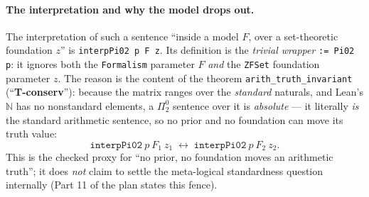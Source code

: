 \documentclass[11pt,a4paper]{report}
\begin{document}
\paragraph{The interpretation and why the model drops out.} The interpretation of
such a sentence ``inside a model \(F\), over a set-theoretic foundation \(z\)'' is
\texttt{interpPi02 p F z}. Its definition is the \emph{trivial wrapper}
\texttt{:= Pi02 p}: it ignores both the \texttt{Formalism} parameter \(F\)
\emph{and} the \texttt{ZFSet} foundation parameter \(z\). The reason is the
content of the theorem \texttt{arith\_truth\_invariant} (``\textbf{T-conserv}''):
because the matrix ranges over the \emph{standard} naturals, and Lean's \(\mathbb{N}\)
has no nonstandard elements, a \(\Pi^0_2\) sentence over it is \emph{absolute} ---
it literally \emph{is} the standard arithmetic sentence, so no prior and no
foundation can move its truth value:
\[
  \texttt{interpPi02}\ p\ F_1\ z_1 \;\longleftrightarrow\; \texttt{interpPi02}\ p\ F_2\ z_2 .
\]
This is the checked proxy for ``no prior, no foundation moves an arithmetic
truth''; it does \emph{not} claim to settle the meta-logical standardness question
internally (Part 11 of the plan states this fence).
\end{document}
